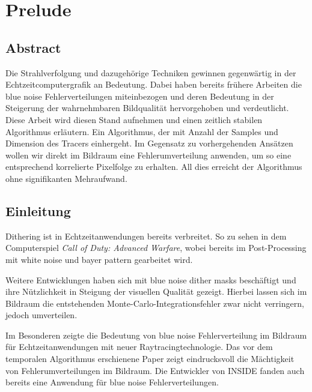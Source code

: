 
\chapter{Prelude}
\label{ch:Introduction}

\section{Abstract}

\vspace*{\fill}
Die Strahlverfolgung und dazugehörige Techniken gewinnen gegenwärtig in der Echtzeitcomputergrafik an Bedeutung. Dabei haben bereits frühere Arbeiten
die blue noise Fehlerverteilungen miteinbezogen und deren Bedeutung in der Steigerung der wahrnehmbaren Bildqualität hervorgehoben und verdeutlicht.
Diese Arbeit wird diesen Stand aufnehmen und einen zeitlich stabilen Algorithmus erläutern. Ein Algorithmus, der mit Anzahl der Samples und Dimension
des Tracers einhergeht. Im Gegensatz zu vorhergehenden Ansätzen wollen wir direkt im Bildraum eine Fehlerumverteilung anwenden, um so eine entsprechend 
korrelierte Pixelfolge zu erhalten. All dies erreicht der Algorithmus ohne signifikanten Mehraufwand.
\vfill

\newpage

\section{Einleitung}
\vspace*{\fill}
Dithering ist in Echtzeitanwendungen bereits verbreitet. So zu sehen in dem Computerspiel \textit{Call of Duty: Advanced Warfare}, wobei 
bereits im Post-Processing \cite{callofdutypostprocessing} mit white noise und bayer pattern gearbeitet wird.\par 
Weitere Entwicklungen \cite{georgiev2016blue} haben sich mit blue noise dither masks  beschäftigt
und ihre Nützlichkeit in Steigung der visuellen Qualität gezeigt. Hierbei lassen sich im Bildraum die entstehenden 
Monte-Carlo-Integrationsfehler  zwar nicht verringern, jedoch umverteilen.\par 
Im Besonderen zeigte \cite{Sch19} die Bedeutung von blue noise Fehlerverteilung im Bildraum für Echtzeitanwendungen mit neuer
Raytracingtechnologie.
Das vor dem temporalen Algorithmus erschienene Paper \cite{heitz:hal02150657} zeigt eindrucksvoll die Mächtigkeit von 
Fehlerumverteilungen im Bildraum. 
Die Entwickler von INSIDE \cite{10.111712.152707} fanden auch bereits eine Anwendung für blue noise Fehlerverteilungen. 


